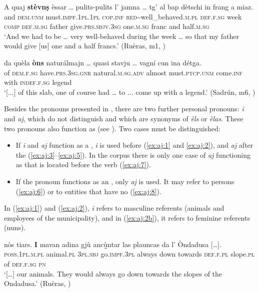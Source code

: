 \ea
\label{ex:nusinvers1}
\gll    A quaj \textbf{stèvnṣ} èssar … pulits-pulits l’ jamna … tg’ al bap dètschi in frang a miaz.\\
and \textsc{dem.unm} must.\textsc{impf.1pl.1pl} \textsc{cop.inf} {} \textsc{red}\textasciitilde{well\_behaved}.\textsc{m.pl} \textsc{def.f.sg} week {} \textsc{comp} \textsc{def.m.sg} father  give.\textsc{prs.sbjv.3sg} one.\textsc{m.sg} franc and half.\textsc{m.sg}\\
\glt `And we had to be … very well-behaved during the week … so that my father would give [us] one and a half francs.' (Ruèras, m1, )
\z

\ea
\label{ex:nusinvers2}
\gll    [...] da quèla \textbf{òns} naturálmajn … quasi stavju … vagní cun ina détga.\\
{} of \textsc{dem.f.sg} have.\textsc{prs.3sg.gnr} natural.\textsc{m.sg.adv} {} almost must.\textsc{ptcp.unm} {} come.\textsc{inf} with \textsc{indef.f.sg} legend\\
\glt `[...] of this slab, one of course had … to ... come up with a legend.' (Sadrún, m6, )
\z

Besides the pronouns presented in , there are two further personal pronouns: \textit{i} and \textit{aj}, which do not distinguish  and which are synonyms of \textit{èls} or \textit{èlas}. These two pronouns also function as  (see ). Two cases must be distinguished:

\begin{itemize}
\item If \textit{i} and \textit{aj} function as a , \textit{i} is used before (\ref{ex:aj:1} and \ref{ex:aj:2}), and \textit{aj} after the  (\ref{ex:aj:3}--\ref{ex:aj:5}). In the corpus there is only one case of \textit{aj} functioning as  that is located before the verb (\ref{ex:aj:7}).
\item If the pronoun functions as an , only \textit{aj} is used. It may refer to persons (\ref{ex:aj:6}) or to entities that have no  (\ref{ex:aj:8}).
\end{itemize}

In (\ref{ex:aj:1}) and (\ref{ex:aj:2}), \textit{i } refers to masculine referents (animals and employees of the municipality), and in (\ref{ex:aj:2b}), it refers to feminine referents (nuns).

\ea
\label{ex:aj:1}
\gll  […] nòs tiars. \textbf{I} mavan adina gjù anc{\`u̱̱}ntar las  plauncas  da l’ Òndadusa […].\\
{} \textsc{poss.1pl.m.pl} animal.\textsc{pl} \textsc{3pl.sbj} go.\textsc{impf.3pl} always down towards \textsc{def.f.pl} slope.\textsc{pl} of \textsc{def.f.sg} \textsc{pn}\\
\glt `[…] our animals. They would always go down towards the slopes of the Ondadusa.' (Ruèras, \citealt[67]{Büchli1966})
\z

